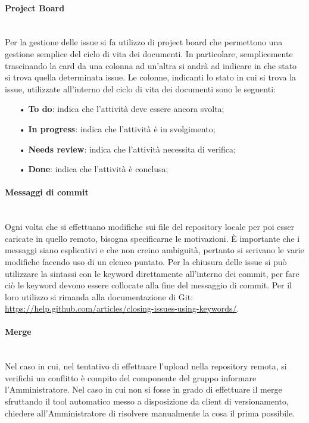 {\paragraph{Project Board}\mbox{}\\
\label{sec:projectboard}
Per la gestione delle {issue} si fa utilizzo di {project board} che permettono una gestione semplice del ciclo di vita dei documenti. 
In particolare, semplicemente trascinando la {card} da una colonna ad un'altra si andrà ad indicare in che stato si trova quella determinata issue.
Le colonne, indicanti lo stato in cui si trova la issue, utilizzate all'interno del ciclo di vita dei documenti sono le seguenti:
\begin{itemize}
\item[•] \textbf{To do}: indica che l'attività deve essere ancora svolta;
\item[•] \textbf{In progress}: indica che l'attività è in svolgimento;
\item[•] \textbf{Needs review}: indica che l'attività necessita di verifica;
\item[•] \textbf{Done}: indica che l'attività è conclusa;
\end{itemize}
\paragraph{Messaggi di commit}\mbox{}\\
Ogni volta che si effettuano modifiche sui file del repository locale per poi esser caricate in
quello remoto, bisogna specificarne le motivazioni. \uppercase{è} importante che i messaggi siano esplicativi e che non creino ambiguità, pertanto si scrivano le varie modifiche facendo uso di un elenco puntato.
Per la chiusura delle issue si può utilizzare la sintassi con le {keyword} direttamente all'interno dei {commit}, per fare ciò le keyword devono essere collocate alla fine del messaggio di commit. Per il loro utilizzo si rimanda alla documentazione di {Git}: \url{https://help.github.com/articles/closing-issues-using-keywords/}. 

\paragraph{Merge}\mbox{}\\
Nel caso in cui, nel tentativo di effettuare l'upload nella repository remota, si verifichi un {conflitto} è compito del componente del gruppo informare l'Amministratore. Nel caso in cui non si fosse in grado di effettuare il {merge} sfruttando il tool automatico messo a disposizione da client di versionamento, chiedere all'Amministratore di risolvere manualmente la cosa il prima possibile.
}
